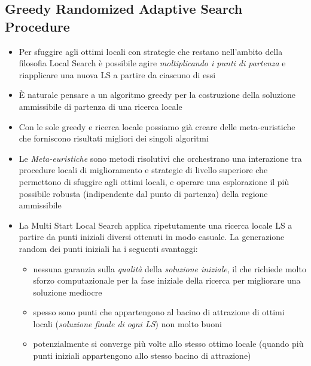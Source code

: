 \documentclass[9pt]{beamer}
\begin{document}
\subsection{Greedy Randomized Adaptive Search Procedure}
\begin{frame}[allowframebreaks]{\subsecname}

	\begin{itemize}
	
		\item
		Per sfuggire agli ottimi locali con strategie che restano nell’ambito della filosofia Local Search è possibile agire \emph{moltiplicando i punti di partenza} e riapplicare una nuova LS a partire da ciascuno di essi

		\item
		È naturale pensare a un algoritmo greedy per la costruzione della soluzione ammissibile di partenza di una ricerca locale

		\item
		Con le sole greedy e ricerca locale possiamo già creare delle meta-euristiche che forniscono risultati migliori dei singoli algoritmi

		\item
		Le \emph{Meta-euristiche} sono metodi risolutivi che orchestrano una interazione tra procedure locali di miglioramento e strategie di livello superiore che permettono di sfuggire agli ottimi locali, e operare una esplorazione il più possibile robusta (indipendente dal punto di partenza) della regione ammissibile

		\item
		La Multi Start Local Search applica ripetutamente una ricerca locale LS a partire da punti iniziali diversi ottenuti in modo casuale. La generazione random dei punti iniziali ha i seguenti svantaggi:
		\begin{itemize}
			\item
			nessuna garanzia sulla \emph{qualità} della \emph{soluzione iniziale}, il che richiede molto sforzo computazionale per la fase iniziale della ricerca per migliorare una soluzione mediocre
			\item
			spesso sono punti che appartengono al bacino di attrazione di ottimi locali (\emph{soluzione finale di ogni LS}) non molto buoni
			\item
			potenzialmente si converge più volte allo stesso ottimo locale (quando più punti iniziali appartengono allo stesso bacino di attrazione)
		\end{itemize}


\end{itemize}
\end{frame}
\end{document}
